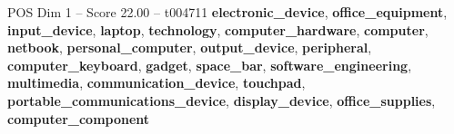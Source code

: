 \begin{textsample}{POS Dim 1 – Score 22.00 – t004711}  \label{ex:f1_pos_037}
\textbf{electronic\_device}, \textbf{office\_equipment}, \textbf{input\_device}, \textbf{laptop}, \textbf{technology}, \textbf{computer\_hardware}, \textbf{computer}, \textbf{netbook}, \textbf{personal\_computer}, \textbf{output\_device}, \textbf{peripheral}, \textbf{computer\_keyboard}, \textbf{gadget}, \textbf{space\_bar}, \textbf{software\_engineering}, \textbf{multimedia}, \textbf{communication\_device}, \textbf{touchpad}, \textbf{portable\_communications\_device}, \textbf{display\_device}, \textbf{office\_supplies}, \textbf{computer\_component}

\end{textsample}
